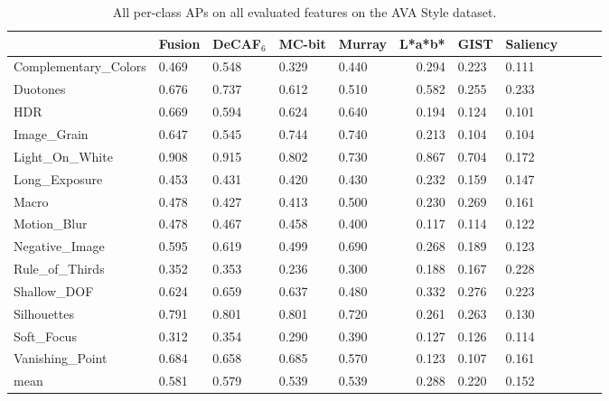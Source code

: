 \begin{table}[ht!]
\caption{
    All per-class APs on all evaluated features on the AVA Style dataset.
}\label{tab:ava_style_ap_table}
\vspace{1em}
\centering
\small{
\begin{tabular}{lllllrlllll}
\toprule
{}                    & Fusion & DeCAF$_6$ & MC-bit & Murray & L*a*b* & GIST  & Saliency \\
\midrule
Complementary\_Colors & 0.469  & 0.548     & 0.329  & 0.440  & 0.294  & 0.223 & 0.111 \\
Duotones              & 0.676  & 0.737     & 0.612  & 0.510  & 0.582  & 0.255 & 0.233 \\
HDR                   & 0.669  & 0.594     & 0.624  & 0.640  & 0.194  & 0.124 & 0.101 \\
Image\_Grain          & 0.647  & 0.545     & 0.744  & 0.740  & 0.213  & 0.104 & 0.104 \\
Light\_On\_White      & 0.908  & 0.915     & 0.802  & 0.730  & 0.867  & 0.704 & 0.172 \\
Long\_Exposure        & 0.453  & 0.431     & 0.420  & 0.430  & 0.232  & 0.159 & 0.147 \\
Macro                 & 0.478  & 0.427     & 0.413  & 0.500  & 0.230  & 0.269 & 0.161 \\
Motion\_Blur          & 0.478  & 0.467     & 0.458  & 0.400  & 0.117  & 0.114 & 0.122 \\
Negative\_Image       & 0.595  & 0.619     & 0.499  & 0.690  & 0.268  & 0.189 & 0.123 \\
Rule\_of\_Thirds      & 0.352  & 0.353     & 0.236  & 0.300  & 0.188  & 0.167 & 0.228 \\
Shallow\_DOF          & 0.624  & 0.659     & 0.637  & 0.480  & 0.332  & 0.276 & 0.223 \\
Silhouettes           & 0.791  & 0.801     & 0.801  & 0.720  & 0.261  & 0.263 & 0.130 \\
Soft\_Focus           & 0.312  & 0.354     & 0.290  & 0.390  & 0.127  & 0.126 & 0.114 \\
Vanishing\_Point      & 0.684  & 0.658     & 0.685  & 0.570  & 0.123  & 0.107 & 0.161 \\
\midrule
mean                  & 0.581  & 0.579     & 0.539  & 0.539  & 0.288  & 0.220 & 0.152 \\
\bottomrule
\end{tabular}
}
\end{table}

